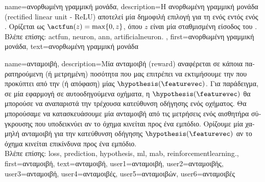 {name={\foreignlanguage{greek}{ανορθωμένη γραμμική μονάδα}},
	description={\foreignlanguage{greek}{Η ανορθωμένη γραμμική μονάδα} 
		(rectified linear unit - ReLU) \foreignlanguage{greek}{αποτελεί μία δημοφιλή επιλογή για τη}
		 \foreignlanguage{greek}{ενός}  \foreignlanguage{greek}{εντός ενός} . 
		\foreignlanguage{greek}{Ορίζεται ως $\actfun(z) = \max\{0,z\}$, όπου $z$ είναι μία σταθμισμένη είσοδος του} .
					\\ 
		\foreignlanguage{greek}{Βλέπε επίσης:} \gls{actfun}, \gls{neuron}, \gls{ann}, \gls{artificialneuron}. }, 
	first={\foreignlanguage{greek}{ανορθωμένη γραμμική μονάδα}}, 
	text={\foreignlanguage{greek}{ανορθωμένη γραμμική μονάδα}} 
}%

{name={\foreignlanguage{greek}{ανταμοιβή}}, 
	description={\foreignlanguage{greek}{Μία ανταμοιβή} (reward) \foreignlanguage{greek}{αναφέρεται σε κάποια 
		παρατηρούμενη} \foreignlanguage{greek}{(ή μετρημένη) ποσότητα που μας επιτρέπει να 
		εκτιμήσουμε την}  \foreignlanguage{greek}{που προκύπτει από την}  
		\foreignlanguage{greek}{(ή απόφαση) μίας}  $\hypothesis(\featurevec)$. \foreignlanguage{greek}{Για παράδειγμα, 
		σε μία εφαρμογή}  \foreignlanguage{greek}{σε αυτοοδηγούμενα οχήματα, η $\hypothesis(\featurevec)$ θα μπορούσε 
		να αναπαριστά την τρέχουσα κατεύθυνση οδήγησης ενός οχήματος. Θα μπορούσαμε να κατασκευάσουμε μία ανταμοιβή από τις 
		μετρήσεις ενός αισθητήρα σύγκρουσης που υποδεικνύει αν το όχημα κινείται προς ένα εμπόδιο. Ορίζουμε μία χαμηλή ανταμοιβή 
		για την κατεύ\-θυνση οδήγησης $\hypothesis(\featurevec)$ αν το όχημα κινείται επικίνδυνα προς ένα εμπόδιο.} 
		\\
		\foreignlanguage{greek}{Βλέπε επίσης:} \gls{loss}, \gls{prediction}, \gls{hypothesis}, \gls{ml}, \gls{mab}, \gls{reinforcementlearning}.},
	first={\foreignlanguage{greek}{ανταμοιβή}}, 
	text={\foreignlanguage{greek}{ανταμοιβή}},
	user1={\foreignlanguage{greek}{ανταμοιβή}}, %
	user2={\foreignlanguage{greek}{ανταμοιβής}}, %
	user3={\foreignlanguage{greek}{ανταμοιβή}}, %
	user4={\foreignlanguage{greek}{ανταμοιβές}}, %
	user5={\foreignlanguage{greek}{ανταμοιβών}}, %
	user6={\foreignlanguage{greek}{ανταμοιβές}} %
} 

